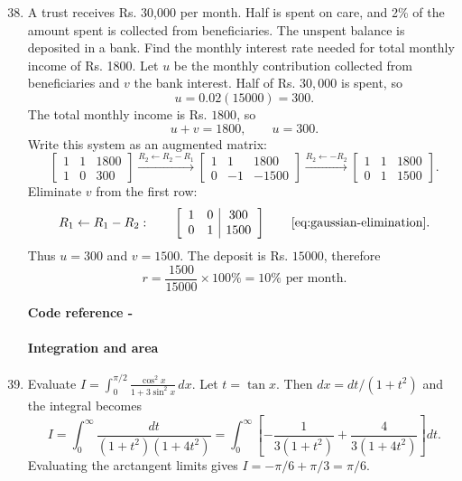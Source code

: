 \begin{enumerate}[label={},leftmargin=0pt]
\begin{enumerate}[label={},leftmargin=0pt,itemsep=9pt]
\setcounter{enumii}{37}
\setcounter{equation}{0}
\item[\textbf{1.2.37}] A trust receives Rs. 30,000 per month. Half is spent on care, and 2\% of the amount spent is collected from beneficiaries. The unspent balance is deposited in a bank. Find the monthly interest rate needed for total monthly income of Rs. 1800.
\solution Let $u$ be the monthly contribution collected from beneficiaries and $v$ the bank interest. Half of Rs. $30,000$ is spent, so
\[
u=0.02(15000)=300.
\]
The total monthly income is Rs. $1800$, so
\[
u+v=1800,\qquad u=300.
\]
Write this system as an augmented matrix:
\[
\left[\begin{array}{cc|c}1&1&1800\\1&0&300\end{array}\right]
\xrightarrow{R_2\leftarrow R_2-R_1}
\left[\begin{array}{cc|c}1&1&1800\\0&-1&-1500\end{array}\right]
\xrightarrow{R_2\leftarrow -R_2}
\left[\begin{array}{cc|c}1&1&1800\\0&1&1500\end{array}\right].
\]
Eliminate $v$ from the first row:
\[
R_1\leftarrow R_1-R_2:\qquad
\left[\begin{array}{cc|c}1&0&300\\0&1&1500\end{array}\right]\qquad\eqref{eq:gaussian-elimination}.
\]
Thus $u=300$ and $v=1500$. The deposit is Rs. $15000$, therefore
\[
r=\frac{1500}{15000}\times100\%=10\%\text{ per month}.
\]
\par\smallskip
\noindent\textbf{Code reference -}
\par\noindent{}
\par\smallskip



\paragraph*{Integration and area}
\setcounter{enumii}{38}
\setcounter{equation}{0}
\item[\textbf{1.2.38}] Evaluate $\displaystyle I=\int_0^{\pi/2}\frac{\cos^2x}{1+3\sin^2x}\,dx$.
\solution Let $t=\tan x$. Then $dx=dt/(1+t^2)$ and the integral becomes
\[
I=\int_0^\infty\frac{dt}{(1+t^2)(1+4t^2)}=\int_0^\infty\left[-\frac1{3(1+t^2)}+\frac4{3(1+4t^2)}\right]dt.
\]
Evaluating the arctangent limits gives $I=-\pi/6+\pi/3=\pi/6$.


\end{enumerate}
\end{enumerate}
